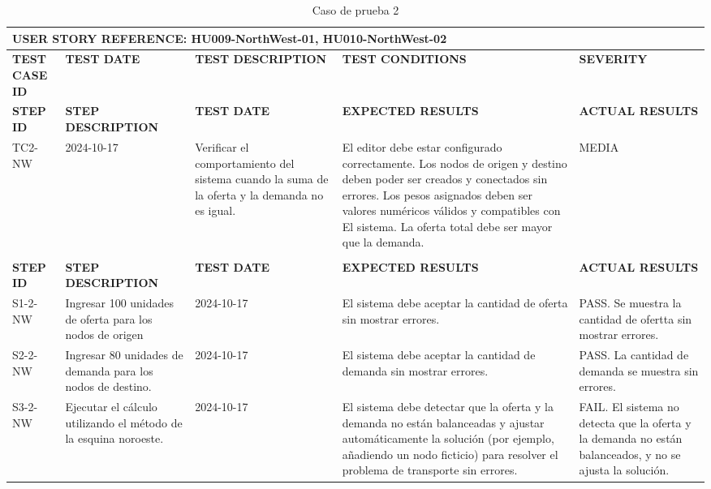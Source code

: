 \documentclass[stu, 12pt, letterpaper, donotrepeattitle, floatsintext, natbib]{apa7}
\begin{document}
\begin{longtable}{|p{2cm}|p{3cm}|p{3cm}|p{3cm}|p{3cm}|}
    \caption{Caso de prueba 2} \label{tab:casos_prueba2} \\
    \hline
        \multicolumn{5}{|l|}{\textbf{USER STORY REFERENCE: HU009-NorthWest-01, HU010-NorthWest-02}} \\ \hline

    \textbf{TEST CASE ID} & \textbf{TEST DATE} & \textbf{TEST DESCRIPTION} & \textbf{TEST CONDITIONS} & \textbf{SEVERITY } \\ \hline
    \endfirsthead
    \hline
    \textbf{STEP ID} & \textbf{STEP DESCRIPTION} & \textbf{TEST DATE} & \textbf{EXPECTED RESULTS} & \textbf{ACTUAL RESULTS} \\ \hline
    \endhead
    TC2-NW & 2024-10-17 & Verificar el comportamiento del sistema cuando la suma de la oferta y la demanda no es igual. & El editor debe estar configurado correctamente. Los nodos de origen y destino deben poder ser creados y conectados sin errores. Los pesos asignados deben ser valores numéricos válidos y compatibles con El sistema. La oferta total debe ser mayor que  la demanda. & MEDIA                                                                                                     \\ \\ \hline
    \textbf{STEP ID} & \textbf{STEP DESCRIPTION} & \textbf{TEST DATE} & \textbf{EXPECTED RESULTS} & \textbf{ACTUAL RESULTS} \\ \hline
    S1-2-NW & Ingresar 100 unidades de oferta para los nodos de origen & 2024-10-17 & El sistema debe aceptar la cantidad de oferta sin mostrar errores. & PASS. Se muestra la cantidad de ofertta sin mostrar errores. \\ \hline
    S2-2-NW & Ingresar 80 unidades de demanda para los nodos de destino. & 2024-10-17 & El sistema debe aceptar la cantidad de demanda sin mostrar errores. & PASS. La cantidad de demanda se muestra sin errores. \\ \hline
    S3-2-NW & Ejecutar el cálculo utilizando el método de la esquina noroeste. & 2024-10-17 & El sistema debe detectar que la oferta y la demanda no están balanceadas y ajustar automáticamente la solución (por ejemplo, añadiendo un nodo ficticio) para resolver el problema de transporte sin errores. & FAIL. El sistema no detecta que la oferta y la demanda no están balanceados, y no se ajusta la solución. \\ \hline
\end{longtable}
\end{document}
